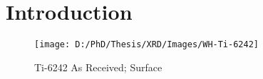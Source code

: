 \chapter{Introduction}
\begin{figure}[H]
    \centering
        \texttt{[image: D:/PhD/Thesis/XRD/Images/WH-Ti-6242]}
        \caption{Ti-6242 As Received; Surface}
    \label{fig:EDM-Cut}
\end{figure}

